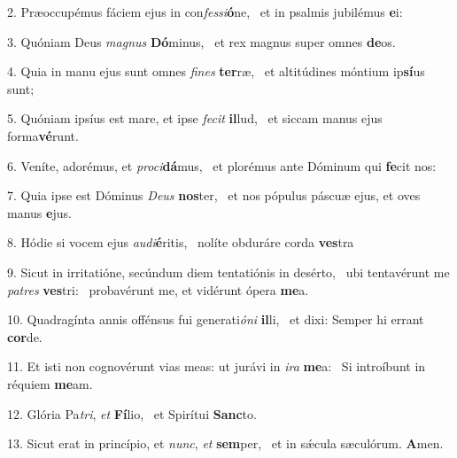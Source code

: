 2. Præoccupémus fáciem ejus in con\textit{fes}\textit{si}\textbf{ó}ne, \ast\  et in psalmis jubilémus \textbf{e}i:\

3. Quóniam Deus \textit{ma}\textit{gnus} \textbf{Dó}minus, \ast\  et rex magnus super omnes \textbf{de}os.\

4. Quia in manu ejus sunt omnes \textit{fi}\textit{nes} \textbf{ter}ræ, \ast\  et altitúdines móntium ip\textbf{sí}us sunt;\

5. Quóniam ipsíus est mare, et ipse \textit{fe}\textit{cit} \textbf{il}lud, \ast\  et siccam manus ejus forma\textbf{vé}runt.\

6. Veníte, adorémus, et \textit{pro}\textit{ci}\textbf{dá}mus, \ast\  et plorémus ante Dóminum qui \textbf{fe}cit nos:\

7. Quia ipse est Dóminus \textit{De}\textit{us} \textbf{nos}ter, \ast\  et nos pópulus páscuæ ejus, et oves manus \textbf{e}jus.\

8. Hódie si vocem ejus \textit{au}\textit{di}\textbf{é}ritis, \ast\  nolíte obduráre corda \textbf{ves}tra\

9. Sicut in irritatióne, secúndum diem tentatiónis in desérto, \dag\  ubi tentavérunt me \textit{pa}\textit{tres} \textbf{ves}tri: \ast\  probavérunt me, et vidérunt ópera \textbf{me}a.\

10. Quadragínta annis offénsus fui generati\textit{ó}\textit{ni} \textbf{il}li, \ast\  et dixi: Semper hi errant \textbf{cor}de.\

11. Et isti non cognovérunt vias meas: ut jurávi in \textit{i}\textit{ra} \textbf{me}a: \ast\  Si introíbunt in réquiem \textbf{me}am.\

12. Glória Pa\textit{tri}, \textit{et} \textbf{Fí}lio, \ast\  et Spirítui \textbf{Sanc}to.\

13. Sicut erat in princípio, et \textit{nunc}, \textit{et} \textbf{sem}per, \ast\  et in sǽcula sæculórum. \textbf{A}men.\

